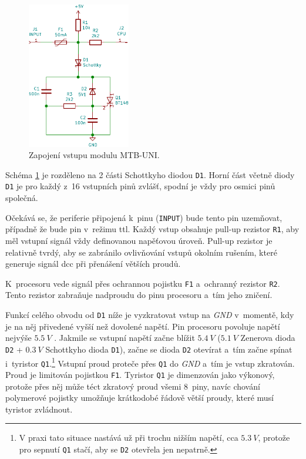 \begin{figure}[ht]
\includegraphics[width=0.4\textwidth]{data/uni-input/uni-input.pdf}
\caption{Zapojení vstupu modulu MTB-UNI.}
\label{fig:mtbuni-input}
\end{figure}

Schéma \ref{fig:mtbuni-input} je rozděleno na 2 části Schottkyho diodou
\texttt{D1}. Horní část včetně diody \texttt{D1} je pro každý z~16 vstupních
pinů zvlášť, spodní je vždy pro osmici pinů společná.

Očekává se, že periferie připojená k~pinu (\texttt{INPUT}) bude tento pin
uzemňovat, případně že bude pin v~režimu \gls{ttl}. Každý vstup obsahuje
pull-up rezistor \texttt{R1}, aby měl vstupní signál vždy definovanou napěťovou
úroveň. Pull-up rezistor je relativně tvrdý, aby se zabránilo ovlivňování
vstupů okolním rušením, které generuje signál \gls{dcc} při přenášení větších
proudů.

K~procesoru vede signál přes ochrannou pojistku \texttt{F1} a~ochranný rezistor
\texttt{R2}. Tento rezistor zabraňuje nadproudu do pinu procesoru a~tím jeho
zničení.

Funkcí celého obvodu od \texttt{D1} níže je vyzkratovat vstup na \textit{GND} v~momentě,
kdy je na něj přivedené vyšší než dovolené napětí. Pin procesoru povoluje
napětí nejvýše $5.5~V$ \cite{atmega128a-datasheet}. Jakmile se vstupní napětí
začne blížit $5.4~V$ ($5.1~V$ Zenerova dioda \texttt{D2} + $0.3~V$ Schottkyho
dioda \texttt{D1}), začne se dioda \texttt{D2} otevírat a~tím začne spínat
i~tyristor \texttt{Q1}.\footnote{V praxi tato situace nastává už při trochu
nižším napětí, cca $5.3~V$, protože pro sepnutí \texttt{Q1} stačí, aby se
\texttt{D2} otevřela jen nepatrně.} Vstupní proud proteče přes \texttt{Q1} do
\textit{GND} a~tím je vstup zkratován. Proud je limitován pojistkou \texttt{F1}.
Tyristor \texttt{Q1} je dimenzován jako výkonový, protože přes něj může téct zkratový
proud všemi 8~piny, navíc chování polymerové pojistky umožňuje krátkodobé řádově
větší proudy, které musí tyristor zvládnout.

